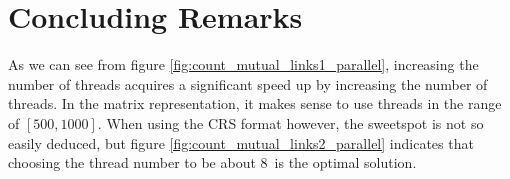 \documentclass[english,notitlepage, reprint]{revtex4-1}  %
\begin{document}
\section{Concluding Remarks}
As we can see from figure \ref{fig:count_mutual_links1_parallel}, increasing the number of threads acquires a significant speed up by increasing the number of threads. In the matrix representation, it makes sense to use threads in the range of $[500, 1000]$. When using the CRS format however, the sweetspot is not so easily deduced, but figure \ref{fig:count_mutual_links2_parallel} indicates that choosing the thread number to be about $8$ is the optimal solution.
\end{document}
